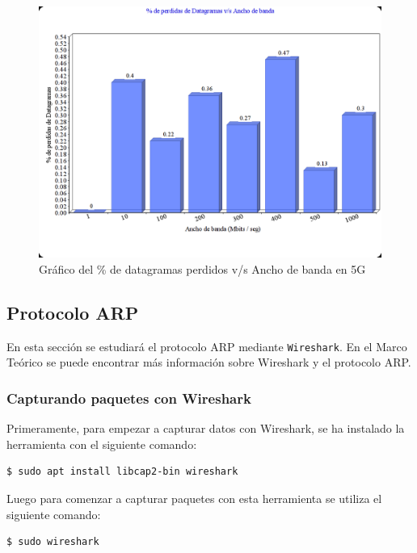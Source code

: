 \begin{figure}[!h]
	\centering
	\includegraphics[scale=0.5]{images/graph.png}
	\caption{Gráfico del \% de datagramas perdidos v/s Ancho de banda en 5G}
	\label{diag:iperf3}
\end{figure}



\subsection{Protocolo ARP}
 
 \noindent En esta sección se estudiará el protocolo ARP mediante \verb|Wireshark|. En el Marco Teórico se puede encontrar más información sobre Wireshark y el protocolo ARP. 
 
 
 \subsubsection{Capturando paquetes con Wireshark}
 
 Primeramente, para empezar a capturar datos con Wireshark, se ha instalado la herramienta con el siguiente comando: 
 
 \begin{lstlisting}
$ sudo apt install libcap2-bin wireshark
\end{lstlisting}

\noindent Luego para comenzar a capturar paquetes con esta herramienta se utiliza el siguiente comando: 
 \begin{lstlisting}
$ sudo wireshark 
\end{lstlisting}

